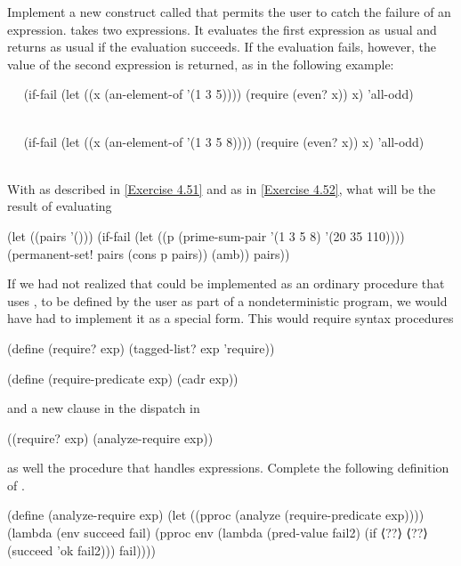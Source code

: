 \begin{exercise}
	\label{Exercise 4.52}
	Implement a new construct called  that permits the user to catch the failure of an expression.
	 takes two expressions.
	It evaluates the first expression as usual and returns as usual if the evaluation succeeds.
	If the evaluation fails, however, the value of the second expression is returned, as in the following example:
	\begin{scheme}
	  ~~
	  (if-fail (let ((x (an-element-of '(1 3 5))))
	             (require (even? x))
	             x)
	           'all-odd)
	  ~~
	  ~~
	  ~~

	  ~~
	  (if-fail (let ((x (an-element-of '(1 3 5 8))))
	             (require (even? x))
	             x)
	           'all-odd)
	  ~~
	  ~~
	  ~~
	\end{scheme}
\end{exercise}



\begin{exercise}
	\label{Exercise 4.53}
	With  as described in \cref{Exercise 4.51} and  as in \cref{Exercise 4.52}, what will be the result of evaluating
	\begin{scheme}
	  (let ((pairs '()))
	    (if-fail
	     (let ((p (prime-sum-pair '(1 3 5 8)
	                              '(20 35 110))))
	       (permanent-set! pairs (cons p pairs))
	       (amb))
	     pairs))
	\end{scheme}
\end{exercise}



\begin{exercise}
	\label{Exercise 4.54}
	If we had not realized that  could be implemented as an ordinary procedure that uses , to be defined by the user as part of a nondeterministic program, we would have had to implement it as a special form.
	This would require syntax procedures
	\begin{scheme}
	  (define (require? exp)
	    (tagged-list? exp 'require))

	  (define (require-predicate exp)
	    (cadr exp))
	\end{scheme}
	and a new clause in the dispatch in \code{analyze}
	\begin{scheme}
	  ((require? exp) (analyze-require exp))
	\end{scheme}
	as well the procedure  that handles  expressions.
	Complete the following definition of \code{analyze-require}.
	\begin{scheme}
	  (define (analyze-require exp)
	    (let ((pproc (analyze (require-predicate exp))))
	      (lambda (env succeed fail)
	        (pproc env
	               (lambda (pred-value fail2)
	                 (if ⟨??⟩
	                     ⟨??⟩
	                     (succeed 'ok fail2)))
	               fail))))

	\end{scheme}
\end{exercise}
